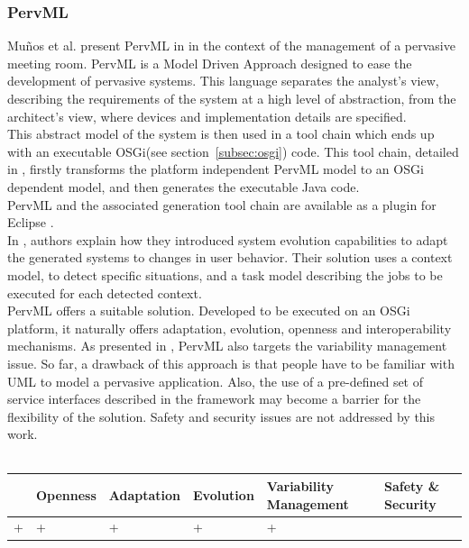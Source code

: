 \subsubsection{PervML}
Mu\~nos et al. present PervML in \cite{Munoz:2006a}\cite{Munoz:2006b} in the context of the management of a pervasive meeting room. PervML is a Model Driven Approach designed to ease the development of pervasive systems. This language separates the analyst's view, describing the requirements of the system at a high level of abstraction, from the architect's view, where devices and implementation details are specified.\\
This abstract model of the system is then used in a tool chain which ends up with an executable OSGi(see section~\ref{subsec:osgi}) code. This tool chain, detailed in \cite{Munoz:2006}, firstly transforms the platform independent PervML model to an OSGi dependent model, and then generates the executable Java code.\\
PervML and the associated generation tool chain are available as a plugin for Eclipse \cite{Cetina:2007}.\\
In \cite{Serral:2010a}, authors explain how they introduced system evolution capabilities to adapt the generated systems to changes in user behavior. Their solution uses a context model, to detect specific situations, and a task model describing the jobs to be executed for each detected context.\\

PervML offers a suitable solution. Developed to be executed on an OSGi platform, it naturally offers adaptation, evolution, openness and interoperability mechanisms. As presented in \cite{Cetina:2009}, PervML also targets the variability management issue. So far, a drawback of this approach is that people have to be familiar with UML to model a pervasive application. Also, the use of a pre-defined set of service interfaces described in the framework may become a barrier for the flexibility of the solution. Safety and security issues are not addressed by this work.\\
\\
\begin{tabular}{ >{\centering}m{}| >{\centering}m{} >{\centering}m{}| >{\centering}m{} >{\centering}m{}| >{\centering\arraybackslash}m{}}
{\tiny Interoperability} & {\tiny Openness} & {\tiny Adaptation} & {\tiny Evolution} & {\tiny Variability Management} & {\tiny Safety \& Security}\\
 \hline
 + & + & + & + & + & \\ 
  \hline
\end{tabular}\\




